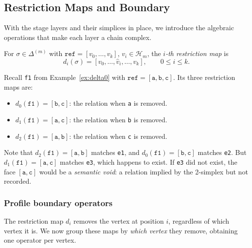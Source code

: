 
\subsection{Restriction Maps and Boundary}

With the stage layers and their simplices in place, we introduce the algebraic operations that make each layer a chain complex.

\begin{definition}
\label{def:restriction-maps}
For $\sigma \in \Delta^{(m)}$ with $\texttt{ref} = [v_0, \ldots, v_k]$, $v_i \in \mathcal{H}_m$, the \emph{$i$-th restriction map} is
\[
d_i(\sigma) = [v_0, \ldots, \hat{v}_i, \ldots, v_k], \qquad 0 \leq i \leq k.
\]
\end{definition}

\begin{example}
Recall \texttt{f1} from Example~\ref{ex:delta0} with $\texttt{ref} = [\texttt{a}, \texttt{b}, \texttt{c}]$. Its three restriction maps are:
\begin{itemize}
\item $d_0(\texttt{f1}) = [\texttt{b}, \texttt{c}]$: the relation when \texttt{a} is removed.
\item $d_1(\texttt{f1}) = [\texttt{a}, \texttt{c}]$: the relation when \texttt{b} is removed.
\item $d_2(\texttt{f1}) = [\texttt{a}, \texttt{b}]$: the relation when \texttt{c} is removed.
\end{itemize}
Note that $d_2(\texttt{f1}) = [\texttt{a}, \texttt{b}]$ matches \texttt{e1}, and $d_0(\texttt{f1}) = [\texttt{b}, \texttt{c}]$ matches \texttt{e2}. But $d_1(\texttt{f1}) = [\texttt{a}, \texttt{c}]$ matches \texttt{e3}, which happens to exist. If \texttt{e3} did not exist, the face $[\texttt{a}, \texttt{c}]$ would be a \emph{semantic void}: a relation implied by the 2-simplex but not recorded.
\end{example}

\subsubsection*{Profile boundary operators}

The restriction map $d_i$ removes the vertex at position $i$, regardless of which vertex it is. We now group these maps by \emph{which vertex} they remove, obtaining one operator per vertex.

